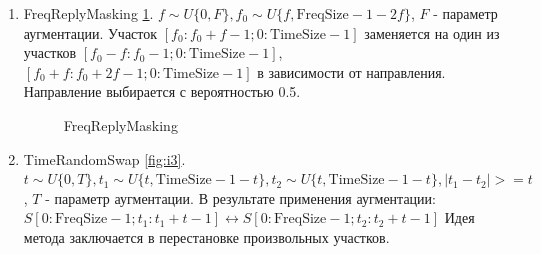 \documentclass[12pt, fleqn]{article}
\begin{document}
\begin{enumerate}
		\item FreqReplyMasking \ref{fig:i17}. \newline
		$f \sim U\{0, F\}, f_0 \sim U\{f, \text{FreqSize} - 1 - 2 f\}$, $F$ - параметр аугментации. \newline Участок $[f_0: f_0 + f - 1; 0:\text{TimeSize} - 1]$ заменяется на один из участков \newline $[f_0 - f: f_0 - 1; 0:\text{TimeSize} - 1]$, $[f_0 + f: f_0 + 2 f - 1; 0:\text{TimeSize} - 1]$ в зависимости от направления. Направление выбирается с вероятностью 0.5.
		\begin{figure}[h]
			\caption{FreqReplyMasking}
			\label{fig:i17}
		\end{figure}
		\item TimeRandomSwap \ref{fig:i3}. \newline
		$t \sim U\{0, T\}, t_1 \sim U\{t, \text{TimeSize} - 1 - t\}, t_2 \sim U\{t, \text{TimeSize} - 1 - t\}, |t_1 - t_2| >= t $, $T$ - параметр аугментации. \newline 
		В результате применения аугментации: \newline
		$S[0:\text{FreqSize} - 1; t_1: t_1 + t - 1] \leftrightarrow S[0:\text{FreqSize} - 1; t_2 : t_2 + t - 1]$ \newline
		Идея метода заключается в перестановке произвольных участков.
		\begin{figure}[h]

\end{figure}
\end{enumerate}
\end{document}

